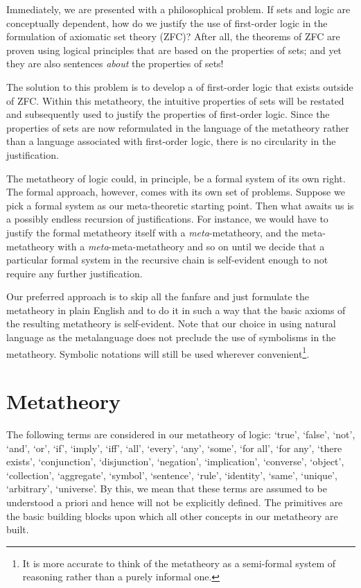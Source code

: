 \vspace{0.3cm}
\noindent
Immediately, we are presented with a philosophical problem. If sets and logic are conceptually dependent, how do we justify the use of first-order logic
in the formulation of axiomatic set theory (ZFC)?
After all, the theorems of ZFC are proven using logical principles that are based on the properties of sets;
and yet they are also sentences \emph{about} the properties of sets!

\vspace{0.3cm}
\noindent
The solution to this problem is to develop a  of first-order logic that exists outside of ZFC.
Within this metatheory, the intuitive properties of sets will be restated and subsequently used to justify the properties of
first-order logic. Since the properties of sets are now reformulated in the language of the metatheory rather than a language associated with first-order logic,
there is no circularity in the justification.

\vspace{0.3cm}
\noindent
The metatheory of logic could, in principle, be a formal system of its own right.
The formal approach, however, comes with its own set of problems.
Suppose we pick a formal system as our meta-theoretic starting point.
Then what awaits us is a possibly endless recursion of justifications.
For instance, we would have to justify the formal metatheory itself
with a \emph{meta}-metatheory, and the meta-metatheory with a \emph{meta}-meta-metatheory and so on until
we decide that a particular formal system in the recursive chain is self-evident enough to not require any further justification.

\vspace{0.3cm}
\noindent
Our preferred approach is to skip all the fanfare and just formulate the metatheory in plain English
and to do it in such a way that the basic axioms of the resulting metatheory is self-evident.
Note that our choice in using natural language as the metalanguage does not preclude the use of symbolisms in the metatheory.
Symbolic notations will still be used wherever convenient\footnote{It is more accurate to think
of the metatheory as a semi-formal system of reasoning rather than a purely informal one.}.

\section{Metatheory}  \label{sec:metatheory}
The following terms are considered  in our metatheory of logic: `true', `false',
`not', `and', `or', `if', `imply', `iff', `all', `every', `any', `some', `for all', `for any', `there exists', `conjunction', `disjunction', `negation',
`implication', `converse', `object', `collection', `aggregate', `symbol', `sentence', `rule', `identity', `same', `unique', `arbitrary', `universe'.
By this, we mean that these terms are assumed to be understood a priori and hence will not be explicitly defined.
The primitives are the basic building blocks upon which all other concepts in our metatheory are built.

